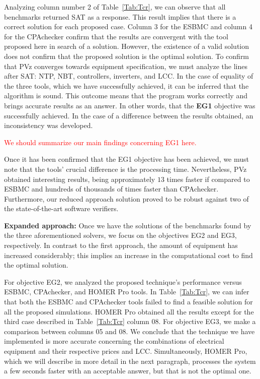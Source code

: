 \documentclass[journal]{IEEEtran}
\begin{document}
Analyzing column number 2 of Table~\ref{Tab:Tcr}, we can observe that all benchmarks returned SAT as a response. This result implies that there is a correct solution for each proposed case. Column 3 for the ESBMC and column 4 for the CPAchecker confirm that the results are convergent with the tool proposed here in search of a solution. However, the existence of a valid solution does not confirm that the proposed solution is the optimal solution. To confirm that PVz converges towards equipment specification, we must analyze the lines after SAT: NTP, NBT, controllers, inverters, and LCC. In the case of equality of the three tools, which we have successfully achieved, it can be inferred that the algorithm is sound. This outcome means that the program works correctly and brings accurate results as an answer. In other words, that the \textbf{EG1} objective was successfully achieved. In the case of a difference between the results obtained, an inconsistency was developed.
%
\begin{tcolorbox}
\textcolor{red}{We should summarize our main findings concerning EG1 here.}
\end{tcolorbox}

Once it has been confirmed that the EG1 objective has been achieved, we must note that the tools' crucial difference is the processing time. Nevertheless, PVz obtained interesting results, being approximately $13$ times faster if compared to ESBMC and hundreds of thousands of times faster than CPAchecker. Furthermore, our reduced approach solution proved to be robust against two of the state-of-the-art software verifiers.

\textbf{Expanded approach:} Once we have the solutions of the benchmarks found by the three aforementioned solvers, we focus on the objectives EG2 and EG3, respectively. In contrast to the first approach, the amount of equipment has increased considerably; this implies an increase in the computational cost to find the optimal solution.

For objective EG2, we analyzed the proposed technique's performance versus ESBMC, CPAchecker, and HOMER Pro tools. In Table~\ref{Tab:Tcr}, we can infer that both the ESBMC and CPAchecker tools failed to find a feasible solution for all the proposed simulations. HOMER Pro obtained all the results except for the third case described in Table~\ref{Tab:Tcr} column 08. For objective EG3, we make a comparison between columns 05 and 08. We conclude that the technique we have implemented is more accurate concerning the combinations of electrical equipment and their respective prices and LCC. Simultaneously, HOMER Pro, which we will describe in more detail in the next paragraph, processes the system a few seconds faster with an acceptable answer, but that is not the optimal one.
\end{document}
